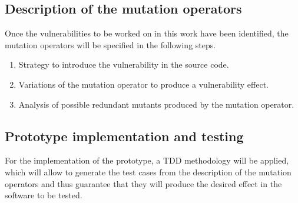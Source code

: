 \subsection{Description of the mutation operators}

Once the vulnerabilities to be worked on in this work have been identified, the mutation operators will be specified in the following steps.

\begin{enumerate}
    \item Strategy to introduce the vulnerability in the source code.
    \item Variations of the mutation operator to produce a vulnerability effect.
    \item Analysis of possible redundant mutants produced by the mutation operator.
\end{enumerate}

\subsection{Prototype implementation and testing}

For the implementation of the prototype, a TDD methodology\cite{williams2003test} will be applied, which will allow to generate the test cases from the description of the mutation operators and thus guarantee that they will produce the desired effect in the software to be tested.